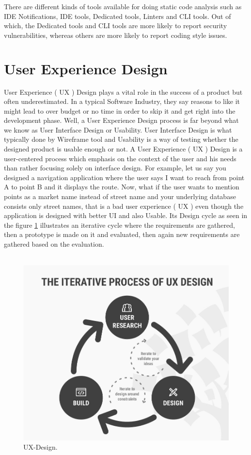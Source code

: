 There are different kinds of tools available for doing static code analysis such as IDE Notifications, IDE tools, Dedicated tools, Linters and CLI tools. Out of which, the Dedicated tools and CLI tools are more likely to report security vulnerabilities, whereas others are more likely to report coding style issues. 

\section{User Experience Design} 

User Experience ( UX ) Design plays a vital role in the success of a product but often underestimated. In a typical Software Industry, they say reasons to like it might lead to over budget or no time in order to skip it and get right into the development phase. Well, a User Experience Design process is far beyond what we know as User Interface Design or Usability.  User Interface Design is what typically done by Wireframe tool and Usability is a way of testing whether the designed product is usable enough or not. A User Experience ( UX ) Design is a user-centered process which emphasis on the context of the user and his needs than rather focusing solely on interface design. \cite{UX} For example, let us say you designed a navigation application where the user says I want to reach from point A to point B and it displays the route. Now, what if the user wants to mention points as a market name instead of street name and your underlying database consists only street names, that is a bad user experience ( UX ) even though the application is designed with better UI and also Usable. Its Design \cite{UXD} cycle as seen in the figure \ref{fig:ux-design} illustrates an iterative cycle where the requirements are gathered, then a prototype is made on it and evaluated, then again new requirements are gathered based on the evaluation. \\ \\

\begin{figure}[hbt!]
	\centering
	\includegraphics[width=\linewidth]{figures/ux-design}
	\caption{UX-Design.\cite{UXD}}
	\label{fig:ux-design}
\end{figure}


